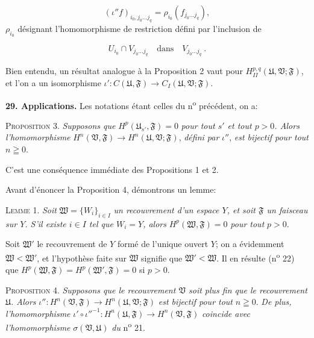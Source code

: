 \begin{equation*}
(\iota'' f)_{i_0 , j_0 \ldots j_q} = \rho_{i_0}(f_{j_0 \ldots j_q}),
\end{equation*}
$\rho_{i_0}$ désignant l'homomorphisme de restriction défini par l'inclusion de

\begin{equation*}
U_{i_0} \cap V_{j_0 \ldots j_q} \quad \text{dans} \quad V_{j_0 \ldots j_q} \ .
\end{equation*}

Bien entendu, un résultat analogue à la Proposition 2 vaut pour $H_{II}^{p,q}(\mathfrak{U}, \mathfrak{V}; \mathfrak{F})$, et l'on a un isomorphisme $\iota': C(\mathfrak{U}, \mathfrak{F}) \rightarrow C_I(\mathfrak{U}, \mathfrak{V}; \mathfrak{F})$.

\textbf{29. Applications.} Les notations étant celles du n\textsuperscript{o} précédent, on a:

\textsc{Proposition} 3. \textit{Supposons que} $H^p(\mathfrak{U}_{s'} , \mathfrak{F}) = 0$ \textit{pour tout $s'$ et tout $p > 0$. Alors l'homomorphisme} $H^n(\mathfrak{V}, \mathfrak{F}) \rightarrow H^n(\mathfrak{U}, \mathfrak{V}; \mathfrak{F})$, \textit{défini par} $\iota''$, \textit{est bijectif pour tout} $n \geqq 0$.

C'est une conséquence immédiate des Propositions 1 et 2.

Avant d'énoncer la Proposition 4, démontrons un lemme:

\textsc{Lemme} 1. \textit{Soit} $\mathfrak{W} = \{W_i\}_{i \in I}$ \textit{un recouvrement d'un espace $Y$, et soit $\mathfrak{F}$ un faisceau sur $Y$. S'il existe $i \in I$ tel que $W_i = Y$, alors} $H^p(\mathfrak{W}, \mathfrak{F}) = 0$ \textit{pour tout} $p > 0$.

Soit $\mathfrak{W}'$ le recouvrement de $Y$ formé de l'unique ouvert $Y$; on a évidemment $\mathfrak{W} < \mathfrak{W}'$, et l'hypothèse faite sur $\mathfrak{W}$ signifie que $\mathfrak{W}' < \mathfrak{W}$. Il en résulte (n\textsuperscript{o} 22) que $H^p(\mathfrak{W}, \mathfrak{F}) = H^p(\mathfrak{W}', \mathfrak{F}) = 0$ si $p > 0$.

\textsc{Proposition} 4. \textit{Supposons que le recouvrement $\mathfrak{V}$ soit plus fin que le recouvrement $\mathfrak{U}$. Alors} $\iota'': H^n(\mathfrak{V}, \mathfrak{F}) \rightarrow H^n(\mathfrak{U}, \mathfrak{V}; \mathfrak{F})$ \textit{est bijectif pour tout} $n \geqq 0$. \textit{De plus, l'homomorphisme} $\iota' \circ \iota''^{-1}: H^n(\mathfrak{U}, \mathfrak{F}) \rightarrow H^n(\mathfrak{V}, \mathfrak{F})$ \textit{coincide avec l'homomorphisme} $\sigma(\mathfrak{V}, \mathfrak{U})$ \textit{du} n\textsuperscript{o} 21.

